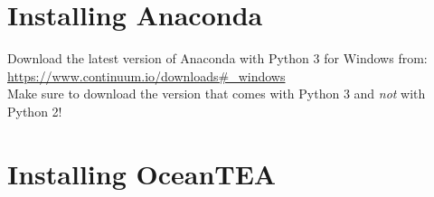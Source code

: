 \documentclass[11pt,a4paper,english,oneside,parskip=false]{scrartcl} %
\begin{document}
\section{Installing Anaconda} \label{sec:anaconda}

Download the latest version of Anaconda with Python 3 for Windows from:\\
\url{https://www.continuum.io/downloads#_windows}\\
Make sure to download the version that comes with Python 3 and \emph{not} with Python 2!


\section{Installing OceanTEA} \label{sec:oceantea}
\end{document}
